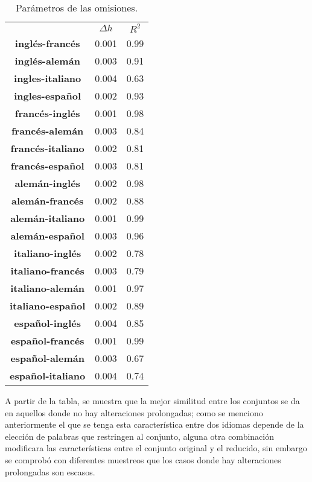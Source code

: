 \begin{table}[h!]
	\centering
	\begin{tabular}{ccc}
		\textbf{}  & \textbf{$\Delta h$}  & \textbf{$R^{2}$}      \\
		\textbf{inglés-francés}    & 0.001           & 0.99       \\
		\textbf{inglés-alemán}     & 0.003           & 0.91       \\
		\textbf{ingles-italiano}   & 0.004           & 0.63       \\
		\textbf{ingles-español}    & 0.002           & 0.93       \\
		\textbf{francés-inglés}    & 0.001           & 0.98       \\    
		\textbf{francés-alemán}    & 0.003           & 0.84       \\ 
		\textbf{francés-italiano}  & 0.002           & 0.81       \\ 
		\textbf{francés-español}   & 0.003           & 0.81       \\ 
		\textbf{alemán-inglés}     & 0.002           & 0.98       \\
		\textbf{alemán-francés}    & 0.002           & 0.88       \\
		\textbf{alemán-italiano}   & 0.001           & 0.99       \\
		\textbf{alemán-español}    & 0.003           & 0.96       \\
		\textbf{italiano-inglés}   & 0.002           & 0.78       \\
		\textbf{italiano-francés}  & 0.003           & 0.79       \\
		\textbf{italiano-alemán}   & 0.001           & 0.97       \\
		\textbf{italiano-español}  & 0.002           & 0.89       \\
		\textbf{español-inglés}    & 0.004           & 0.85       \\
		\textbf{español-francés}   & 0.001           & 0.99       \\
		\textbf{español-alemán}    & 0.003           & 0.67       \\
		\textbf{español-italiano}  & 0.004           & 0.74       
	\end{tabular}
	\caption{Parámetros de las omisiones.}
	\label{tab.Omision}
\end{table}


A partir de la tabla, se muestra que la mejor similitud entre los conjuntos se da en aquellos donde no hay alteraciones prolongadas; como se menciono anteriormente el que se tenga esta característica entre dos idiomas depende de la elección de palabras que restringen al conjunto, alguna otra combinación modificara las características entre  el conjunto original y el reducido, sin embargo se comprobó con diferentes muestreos que los casos donde hay alteraciones prolongadas son escasos.



